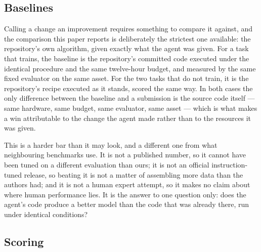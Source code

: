 
\subsection{Baselines}
\label{sec:baselines}

Calling a change an improvement requires something to compare it against, and the comparison this
paper reports is deliberately the strictest one available: the repository's own algorithm, given
exactly what the agent was given. For a task that trains, the baseline is the repository's committed
code executed under the identical procedure and the same twelve-hour budget, and measured by the same
fixed evaluator on the same asset. For the two tasks that do not train, it is the repository's recipe
executed as it stands, scored the same way. In both cases the only difference between the baseline and
a submission is the source code itself --- same hardware, same budget, same evaluator, same asset ---
which is what makes a win attributable to the change the agent made rather than to the resources it
was given.

This is a harder bar than it may look, and a different one from what neighbouring benchmarks use. It
is not a published number, so it cannot have been tuned on a different evaluation than ours; it is not
an official instruction-tuned release, so beating it is not a matter of assembling more data than the
authors had; and it is not a human expert attempt, so it makes no claim about where human performance
lies. It is the answer to one question only: does the agent's code produce a better model than the
code that was already there, run under identical conditions?

\subsection{Scoring}
\label{sec:scoring}

